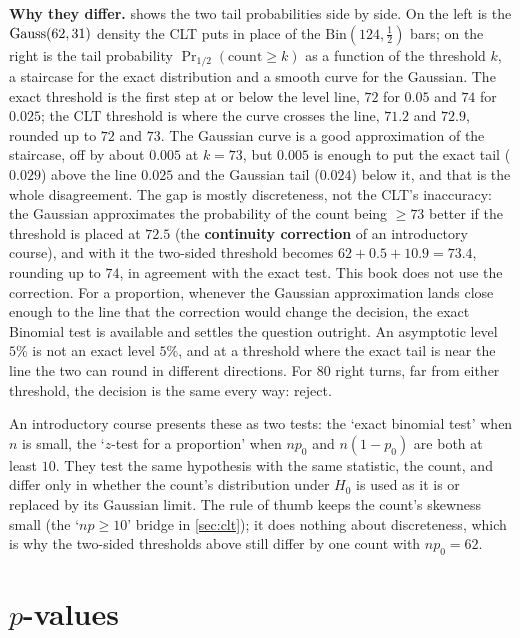 \textbf{Why they differ.}
 shows the two tail probabilities side by side.
On the left is the $\text{Gauss}(62, 31)$ density the CLT puts in place of the $\mathrm{Bin}(124, \frac12)$ bars; on the right is the tail probability $\Pr_{1/2}(\text{count} \geq k)$ as a function of the threshold $k$, a staircase for the exact distribution and a smooth curve for the Gaussian.
The exact threshold is the first step at or below the level line, $72$ for $0.05$ and $74$ for $0.025$; the CLT threshold is where the curve crosses the line, $71.2$ and $72.9$, rounded up to $72$ and $73$.
The Gaussian curve is a good approximation of the staircase, off by about $0.005$ at $k = 73$, but $0.005$ is enough to put the exact tail ($0.029$) above the line $0.025$ and the Gaussian tail ($0.024$) below it, and that is the whole disagreement.
The gap is mostly discreteness, not the CLT's inaccuracy: the Gaussian approximates the probability of the count being $\geq 73$ better if the threshold is placed at $72.5$ (the \textbf{continuity correction} of an introductory course), and with it the two-sided threshold becomes $62 + 0.5 + 10.9 = 73.4$, rounding up to $74$, in agreement with the exact test.
This book does not use the correction. For a proportion, whenever the Gaussian approximation lands close enough to the line that the correction would change the decision, the exact Binomial test is available and settles the question outright. An asymptotic level $5\%$ is not an exact level $5\%$, and at a threshold where the exact tail is near the line the two can round in different directions.
For $80$ right turns, far from either threshold, the decision is the same every way: reject.

\begin{bridge}
An introductory course presents these as two tests: the `exact binomial test' when $n$ is small, the `$z$-test for a proportion' when $np_0$ and $n(1 - p_0)$ are both at least $10$.
They test the same hypothesis with the same statistic, the count, and differ only in whether the count's distribution under $H_0$ is used as it is or replaced by its Gaussian limit.
The rule of thumb keeps the count's skewness small (the `$np \geq 10$' bridge in \cref{sec:clt}); it does nothing about discreteness, which is why the two-sided thresholds above still differ by one count with $np_0 = 62$.
\end{bridge}

\section{\texorpdfstring{$p$}{p}-values}
\label{sec:tests-pvalue}

